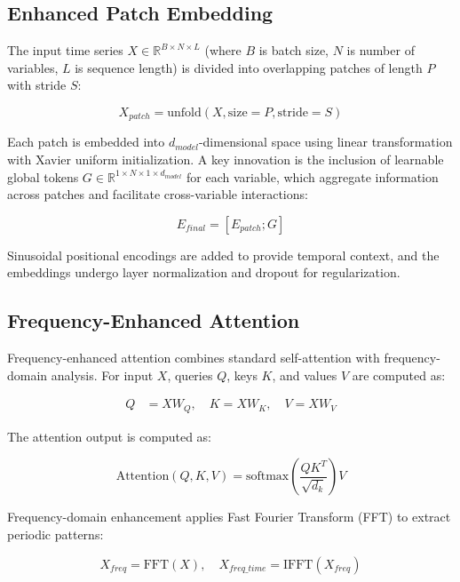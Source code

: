 \documentclass[conference]{IEEEtran}
\begin{document}
\subsection{Enhanced Patch Embedding}

The input time series $X \in \mathbb{R}^{B \times N \times L}$ (where $B$ is batch size, $N$ is number of variables, $L$ is sequence length) is divided into overlapping patches of length $P$ with stride $S$:

\begin{equation}
X_{patch} = \text{unfold}(X, \text{size}=P, \text{stride}=S)
\end{equation}

Each patch is embedded into $d_{model}$-dimensional space using linear transformation with Xavier uniform initialization. A key innovation is the inclusion of learnable global tokens $G \in \mathbb{R}^{1 \times N \times 1 \times d_{model}}$ for each variable, which aggregate information across patches and facilitate cross-variable interactions:

\begin{equation}
E_{final} = [E_{patch}; G]
\end{equation}

Sinusoidal positional encodings are added to provide temporal context, and the embeddings undergo layer normalization and dropout for regularization.

\subsection{Frequency-Enhanced Attention}

Frequency-enhanced attention combines standard self-attention with frequency-domain analysis. For input $X$, queries $Q$, keys $K$, and values $V$ are computed as:

\begin{align}
Q &= X W_Q, \quad K = X W_K, \quad V = X W_V
\end{align}

The attention output is computed as:

\begin{equation}
\text{Attention}(Q, K, V) = \text{softmax}\left(\frac{QK^T}{\sqrt{d_k}}\right)V
\end{equation}

Frequency-domain enhancement applies Fast Fourier Transform (FFT) to extract periodic patterns:

\begin{equation}
X_{freq} = \text{FFT}(X), \quad X_{freq\_time} = \text{IFFT}(X_{freq})
\end{equation}
\end{document}
